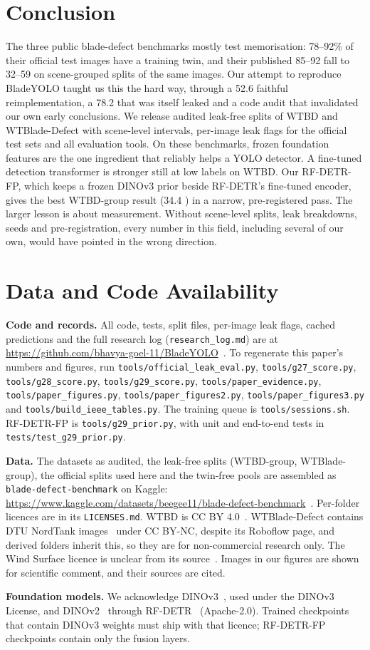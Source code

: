 \section{Conclusion}
The three public blade-defect benchmarks mostly test memorisation: 78--92\% of their official test images have a training twin, and their published 85--92 \mfifty fall to 32--59 on scene-grouped splits of the same images. Our attempt to reproduce BladeYOLO taught us this the hard way, through a 52.6 faithful reimplementation, a 78.2 that was itself leaked and a code audit that invalidated our own early conclusions. We release audited leak-free splits of WTBD and WTBlade-Defect with scene-level intervals, per-image leak flags for the official test sets and all evaluation tools. On these benchmarks, frozen foundation features are the one ingredient that reliably helps a YOLO detector. A fine-tuned detection transformer is stronger still at low labels on WTBD. Our RF-DETR-FP, which keeps a frozen DINOv3 prior beside RF-DETR's fine-tuned encoder, gives the best WTBD-group result (34.4 \mcoco) in a narrow, pre-registered pass. The larger lesson is about measurement. Without scene-level splits, leak breakdowns, seeds and pre-registration, every number in this field, including several of our own, would have pointed in the wrong direction.

\section*{Data and Code Availability}
\textbf{Code and records.} All code, tests, split files, per-image leak flags, cached predictions and the full research log (\texttt{research\_log.md}) are at \url{https://github.com/bhavya-goel-11/BladeYOLO}~\cite{repo}. To regenerate this paper's numbers and figures, run \texttt{tools/official\_leak\_eval.py}, \texttt{tools/g27\_score.py}, \texttt{tools/g28\_score.py}, \texttt{tools/g29\_score.py}, \texttt{tools/paper\_evidence.py}, \texttt{tools/paper\_figures.py}, \texttt{tools/paper\_figures2.py}, \texttt{tools/paper\_figures3.py} and \texttt{tools/build\_ieee\_tables.py}. The training queue is \texttt{tools/sessions.sh}. RF-DETR-FP is \texttt{tools/g29\_prior.py}, with unit and end-to-end tests in \texttt{tests/test\_g29\_prior.py}.

\textbf{Data.} The datasets as audited, the leak-free splits (WTBD-group, WTBlade-group), the official splits used here and the twin-free pools are assembled as \texttt{blade-defect-benchmark} on Kaggle: \url{https://www.kaggle.com/datasets/beegee11/blade-defect-benchmark}~\cite{kaggleds}. Per-folder licences are in its \texttt{LICENSES.md}. WTBD is CC BY 4.0~\cite{wtbd}. WTBlade-Defect contains DTU NordTank images~\cite{shihavuddin,dtudata} under CC BY-NC, despite its Roboflow page, and derived folders inherit this, so they are for non-commercial research only. The Wind Surface licence is unclear from its source~\cite{gfdyolox}. Images in our figures are shown for scientific comment, and their sources are cited.

\textbf{Foundation models.} We acknowledge DINOv3~\cite{dinov3}, used under the DINOv3 License, and DINOv2~\cite{dinov2} through RF-DETR~\cite{rfdetr} (Apache-2.0). Trained checkpoints that contain DINOv3 weights must ship with that licence; RF-DETR-FP checkpoints contain only the fusion layers.
